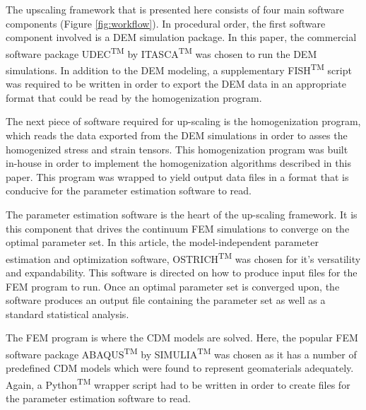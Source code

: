 The upscaling framework that is presented here consists of four main software components (Figure \ref{fig:workflow}). In procedural order, the first software component involved is a DEM simulation package. In this paper, the commercial software package UDEC\textsuperscript{TM} by ITASCA\textsuperscript{TM} was chosen to run the DEM simulations. In addition to the DEM modeling, a supplementary FISH\textsuperscript{TM} script was required to be written in order to export the DEM data in an appropriate format that could be read by the homogenization program. 

The next piece of software required for up-scaling is the homogenization program, which reads the data exported from the DEM simulations in order to asses the homogenized stress and strain tensors. This homogenization program was built in-house in order to implement the homogenization algorithms described in this paper. This program was wrapped to yield output data files in a format that is conducive for the parameter estimation software to read. 

The parameter estimation software is the heart of the up-scaling framework. It is this component that drives the continuum FEM simulations to converge on the optimal parameter set. In this article, the model-independent parameter estimation and optimization software, OSTRICH\textsuperscript{TM} was chosen for it's versatility and expandability. This software is directed on how to produce input files for the FEM program to run. Once an optimal parameter set is converged upon, the software produces an output file containing the parameter set as well as a standard statistical analysis.

The FEM program is where the CDM models are solved. Here, the popular FEM software package ABAQUS\textsuperscript{TM} by SIMULIA\textsuperscript{TM} was chosen as it has a number of predefined CDM models which were found to represent geomaterials adequately. Again, a Python\textsuperscript{TM} wrapper script had to be written in order to create files for the parameter estimation software to read. 